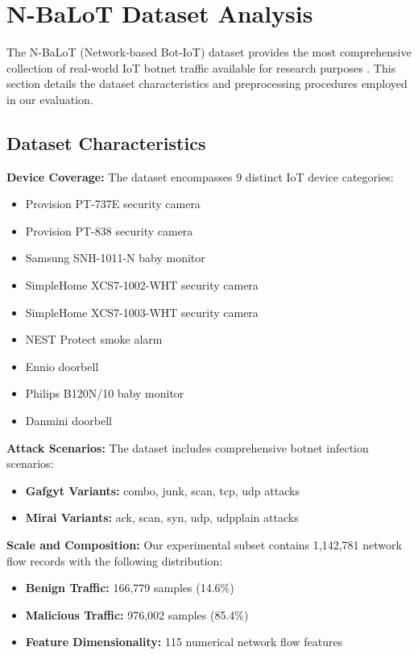 \documentclass[conference]{IEEEtran}
\begin{document}
\section{N-BaLoT Dataset Analysis}

The N-BaLoT (Network-based Bot-IoT) dataset provides the most comprehensive collection of real-world IoT botnet traffic available for research purposes \cite{meidan2018n}. This section details the dataset characteristics and preprocessing procedures employed in our evaluation.

\subsection{Dataset Characteristics}

\textbf{Device Coverage:} The dataset encompasses 9 distinct IoT device categories:
\begin{itemize}
\item Provision PT-737E security camera
\item Provision PT-838 security camera  
\item Samsung SNH-1011-N baby monitor
\item SimpleHome XCS7-1002-WHT security camera
\item SimpleHome XCS7-1003-WHT security camera
\item NEST Protect smoke alarm
\item Ennio doorbell
\item Philips B120N/10 baby monitor
\item Danmini doorbell
\end{itemize}

\textbf{Attack Scenarios:} The dataset includes comprehensive botnet infection scenarios:
\begin{itemize}
\item \textbf{Gafgyt Variants:} combo, junk, scan, tcp, udp attacks
\item \textbf{Mirai Variants:} ack, scan, syn, udp, udpplain attacks
\end{itemize}

\textbf{Scale and Composition:} Our experimental subset contains 1,142,781 network flow records with the following distribution:
\begin{itemize}
\item \textbf{Benign Traffic:} 166,779 samples (14.6\%)
\item \textbf{Malicious Traffic:} 976,002 samples (85.4\%)
\item \textbf{Feature Dimensionality:} 115 numerical network flow features
\end{itemize}
\end{document}
